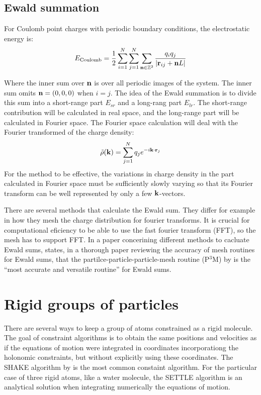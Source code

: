 \subsection{Ewald summation}
For Coulomb point charges with periodic boundary conditions, the electrostatic energy is:
\begin{equation}
	E_{\text{Coulomb}} = \frac{1}{2} \sum_{i=1}^N\sum_{j=1}^N \sum_{\mathbf{n} \in \mathbb{Z}^3} \frac{q_iq_j}{|\mathbf{r}_{ij}+\mathbf{n} L|} 
\end{equation}

Where the inner sum over $\mathbf{n}$ is over all periodic images of the system. The inner sum omits $\mathbf{n} = (0, 0, 0)$ when $i=j$. The idea of the Ewald summation is to divide this sum into a short-range part $E_{sr}$ and a long-rang part $E_{lr}$. The short-range contribution will be calculated in real space, and the long-range part will be calculated in Fourier space. The Fourier space calculation will deal with the Fourier transformed of the charge density:
\begin{equation}
	\tilde{\rho}(\mathbf{k}) = \sum_{j=1}^N q_j e^{-i\mathbf{k}\cdot \mathbf{r}_j}
\end{equation}
For the method to be effective, the variations in charge density in the part calculated in Fourier space must be sufficiently slowly varying so that its Fourier transform can be well represented by only a few $\mathbf{k}$-vectors.

There are several methods that calculate the Ewald sum. They differ for example in how they mesh the charge distribution for fourier transforms. It is crucial for computational eficiency to be able to use the fast fourier transform (FFT), so the mesh has to support FFT. In a paper concerining different methods to cacluate Ewald sums, \citet{Deserno1998} states, in a thorough paper reviewing the accuracy of mesh routines for Ewald sums, that the partilce-particle-particle-mesh routine (P$^3$M) by \citet{Hockney:1988:CSU:62815} is the ``most accurate and versatile routine'' for Ewald sums. 

\section{Rigid groups of particles}
There are several ways to keep a group of atoms constrained as a rigid molecule. The goal of constraint algorithms is to obtain the same positions and velocities as if the equations of motion were integrated in coordinates incorporationg the holonomic constraints, but without explicitly using these coordinates. The SHAKE algorithm by \citet{Ryckaert1977} is the most common constaint algorithm. For the particular case of three rigid atoms, like a water molecule, the SETTLE algorithm \cite{Miyamoto1992} is an analytical solution when integrating numerically the equations of motion.
\label{sec:shake}

